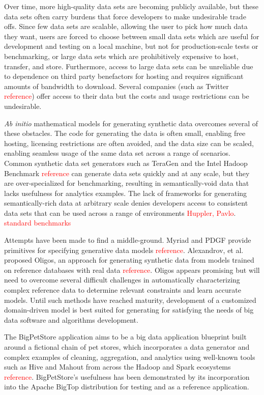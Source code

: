 \documentclass[conference]{IEEEtran}
\begin{document}
Over time, more high-quality data sets are becoming publicly available, but these data sets often carry burdens that force developers to make undesirable trade offs. Since few data sets are scalable, allowing the user to pick how much data they want, users are forced to choose between small data sets which are useful for development and testing on a local machine, but not for production-scale tests or benchmarking, or large data sets which are prohibitively expensive to host, transfer, and store. Furthermore, access to large data sets can be unreliable due to dependence on third party benefactors for hosting and requires significant amounts of bandwidth to download.  Several companies (such as Twitter \textcolor{red}{reference}) offer access to their data but the costs and usage restrictions can be undesirable.

\emph{Ab initio} mathematical models for generating synthetic data overcomes several of these obstacles.  The code for generating the data is often small, enabling free hosting, licensing restrictions are often avoided, and the data size can be scaled, enabling seamless usage of the same data set across a range of scenarios.  Common synthetic data set generators such as TeraGen and the Intel Hadoop Benchmark \textcolor{red}{reference} can generate data sets quickly and at any scale, but they are over-specialized for benchmarking, resulting in semantically-void data that lacks usefulness for analytics examples. The lack of frameworks for generating semantically-rich data at arbitrary scale denies developers access to consistent data sets that can be used across a range of environments \textcolor{red}{Huppler, Pavlo}.  \textcolor{red}{standard benchmarks}

Attempts have been made to find a middle-ground.  Myriad and PDGF provide primitives for specifying generative data models \textcolor{red}{reference}. Alexandrov, et al. proposed Oligos, an approach for generating synthetic data from models trained on reference databases with real data \textcolor{red}{reference}. Oligos appears promising but will need to overcome several difficult challenges in automatically characterizing complex reference data to determine relevant constraints and learn accurate models.  Until such methods have reached maturity, development of a customized domain-driven model is best suited for generating for satisfying the needs of big data software and algorithms development.

The BigPetStore application aims to be a big data application blueprint built around a fictional chain of pet stores, which incorporates a data generator and complex examples of cleaning, aggregation, and analytics using well-known tools such as Hive and Mahout from across the Hadoop and Spark ecosystems \textcolor{red}{reference}. BigPetStore's usefulness has been demonstrated by its incorporation into the Apache BigTop distribution \cite{BigTop} for testing and as a reference application.  
\end{document}
